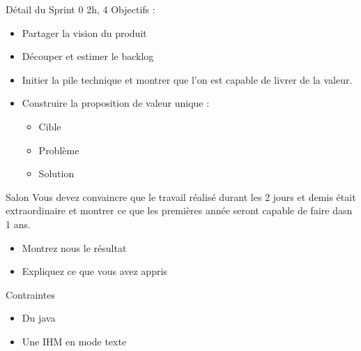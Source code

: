 \documentclass{beamer}
\begin{document}
\begin{frame}{Détail du Sprint 0}
  2h, 4 Objectifs : 
  \begin{itemize}
    \item Partager la vision du produit
    \item Découper et estimer le backlog
    \item Initier la pile technique et montrer que l'on est capable de livrer de la valeur.
    \item Construire la proposition de valeur unique :
    \begin{itemize}
      \item Cible
      \item Problème
      \item Solution
    \end{itemize}
  \end{itemize}
\end{frame}

\begin{frame}{Salon}
  Vous devez convaincre que le travail réalisé durant les 2 jours et demis était extraordinaire et montrer ce que les premières année seront capable de faire dasn 1 ans.
  \begin{itemize}
    \item Montrez nous le résultat
    \item Expliquez ce que vous avez appris
  \end{itemize}
\end{frame}

\begin{frame}{Contraintes}
  \begin{itemize}
    \item Du java
    \item Une IHM en mode texte
  \end{itemize}
\end{frame}
\end{document}
